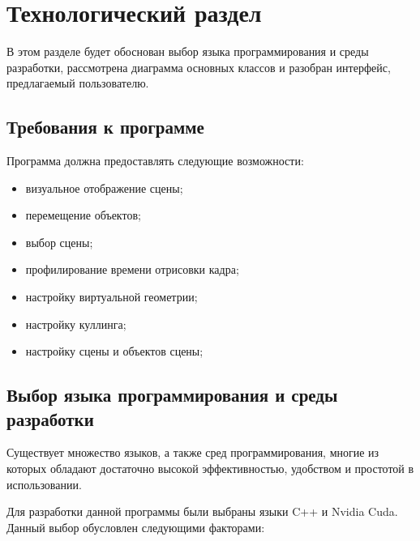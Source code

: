 \chapter{Технологический раздел}
В этом разделе будет обоснован выбор языка программирования и среды разработки, рассмотрена диаграмма основных классов и разобран интерфейс, предлагаемый пользователю.

\section{Требования к программе} 
Программа должна предоставлять следующие возможности:
\begin{itemize}
	\item визуальное отображение сцены;
	\item перемещение объектов;
	\item выбор сцены;
	\item профилирование времени отрисовки кадра;
	\item настройку виртуальной геометрии;
	\item настройку куллинга;
	\item настройку сцены и объектов сцены;
\end{itemize}

\section{Выбор языка программирования и среды разработки}
Существует множество языков, а также сред программирования, многие из которых обладают достаточно высокой эффективностью, удобством и простотой в использовании.

Для разработки данной программы были выбраны языки C++ и Nvidia Cuda. Данный выбор обусловлен следующими факторами:

